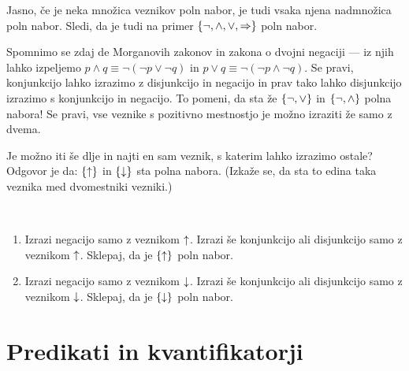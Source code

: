 		Jasno, če je neka množica veznikov poln nabor, je tudi vsaka njena nadmnožica poln nabor. Sledi, da je tudi na primer $\set{\lnot, \land, \lor, \impl}$ poln nabor.
		
		Spomnimo se zdaj de Morganovih zakonov in zakona o dvojni negaciji --- iz njih lahko izpeljemo $p \land q \equiv \lnot(\lnot{p} \lor \lnot{q})$ in $p \lor q \equiv \lnot(\lnot{p} \land \lnot{q})$. Se pravi, konjunkcijo lahko izrazimo z disjunkcijo in negacijo in prav tako lahko disjunkcijo izrazimo s konjunkcijo in negacijo. To pomeni, da sta že $\set{\lnot, \lor}$ in $\set{\lnot, \land}$ polna nabora! Se pravi, vse veznike s pozitivno mestnostjo je možno izraziti že samo z dvema.
		
		Je možno iti še dlje in najti en sam veznik, s katerim lahko izrazimo ostale? Odgovor je da: $\set{\shf}$ in $\set{\luk}$ sta polna nabora. (Izkaže se, da sta to edina taka veznika med dvomestniki vezniki.)
		
		\begin{vaja}\label{VAJA: polni nabori z enim veznikom}
			\
			\begin{enumerate}
				\item
					Izrazi negacijo samo z veznikom $\mathbin{\uparrow}$. Izrazi še konjunkcijo ali disjunkcijo samo z veznikom $\mathbin{\uparrow}$. Sklepaj, da je $\set{\shf}$ poln nabor.
				\item
					Izrazi negacijo samo z veznikom $\mathbin{\downarrow}$. Izrazi še konjunkcijo ali disjunkcijo samo z veznikom $\mathbin{\downarrow}$. Sklepaj, da je $\set{\luk}$ poln nabor.
			\end{enumerate}
		\end{vaja}
		
		
	
	
	\section{Predikati in kvantifikatorji}
	
